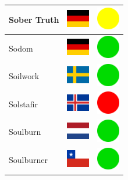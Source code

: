 \documentclass[12pt, a4paper, twoside]{report}
\begin{document}
\begin{center}
\begin{longtable}{|p{5cm}|p{2cm}|p{2cm}|}
 Sober Truth                                                & \includegraphics[width=1cm]{4x3/de} &   \includegraphics[width=1cm]{likes/m} \\ \hline
 Sodom                                                      & \includegraphics[width=1cm]{4x3/de} &   \includegraphics[width=1cm]{likes/y} \\ \hline
 Soilwork                                                   & \includegraphics[width=1cm]{4x3/se} &   \includegraphics[width=1cm]{likes/y} \\ \hline
 Solstafir                                                  & \includegraphics[width=1cm]{4x3/is} &   \includegraphics[width=1cm]{likes/n} \\ \hline
 Soulburn                                                   & \includegraphics[width=1cm]{4x3/nl} &   \includegraphics[width=1cm]{likes/y} \\ \hline
 Soulburner                                                 & \includegraphics[width=1cm]{4x3/cl} &   \includegraphics[width=1cm]{likes/y} \\ \hline

\end{longtable}
\end{center}
\end{document}
